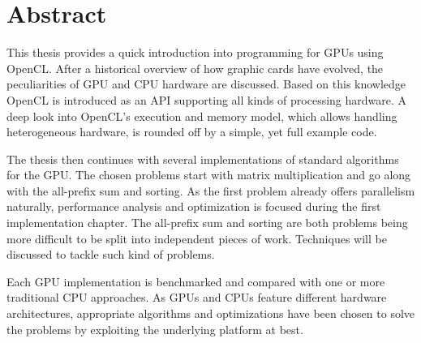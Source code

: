 \section*{Abstract}

This thesis provides a quick introduction into programming for GPUs using OpenCL. After a historical overview of how graphic cards have evolved, the peculiarities of GPU and CPU hardware are discussed. Based on this knowledge OpenCL is introduced as an API supporting all kinds of processing hardware. A deep look into OpenCL's execution and memory model, which allows handling heterogeneous hardware, is rounded off by a simple, yet full example code.

The thesis then continues with several implementations of standard algorithms for the GPU. The chosen problems start with matrix multiplication and go along with the all-prefix sum and sorting. As the first problem already offers parallelism naturally, performance analysis and optimization is focused during the first implementation chapter. The all-prefix sum and sorting are both problems being more difficult to be split into independent pieces of work. Techniques will be discussed to tackle such kind of problems.

Each GPU implementation is benchmarked and compared with one or more traditional CPU approaches. As GPUs and CPUs feature different hardware architectures, appropriate algorithms and optimizations have been chosen to solve the problems by exploiting the underlying platform at best.
